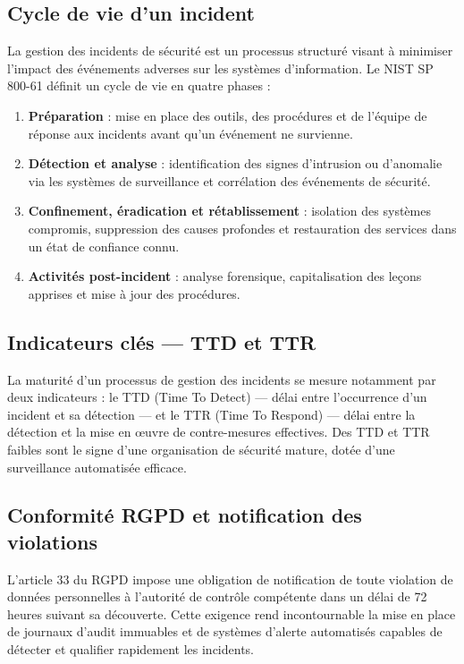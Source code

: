 \subsection{Cycle de vie d'un incident}
La gestion des incidents de sécurité est un processus structuré visant à minimiser l'impact des événements adverses sur les systèmes d'information. Le NIST SP 800-61 \cite{nist} définit un cycle de vie en quatre phases :
\begin{enumerate}
    \item \textbf{Préparation} : mise en place des outils, des procédures et de l'équipe de réponse aux incidents avant qu'un événement ne survienne.
    \item \textbf{Détection et analyse} : identification des signes d'intrusion ou d'anomalie via les systèmes de surveillance et corrélation des événements de sécurité.
    \item \textbf{Confinement, éradication et rétablissement} : isolation des systèmes compromis, suppression des causes profondes et restauration des services dans un état de confiance connu.
    \item \textbf{Activités post-incident} : analyse forensique, capitalisation des leçons apprises et mise à jour des procédures.
\end{enumerate}

\subsection{Indicateurs clés — TTD et TTR}
La maturité d'un processus de gestion des incidents se mesure notamment par deux indicateurs : le TTD (Time To Detect) — délai entre l'occurrence d'un incident et sa détection — et le TTR (Time To Respond) — délai entre la détection et la mise en \oe{}uvre de contre-mesures effectives. Des TTD et TTR faibles sont le signe d'une organisation de sécurité mature, dotée d'une surveillance automatisée efficace.

\subsection{Conformité RGPD et notification des violations}
L'article 33 du RGPD \cite{rgpd} impose une obligation de notification de toute violation de données personnelles à l'autorité de contrôle compétente dans un délai de 72 heures suivant sa découverte. Cette exigence rend incontournable la mise en place de journaux d'audit immuables et de systèmes d'alerte automatisés capables de détecter et qualifier rapidement les incidents.

